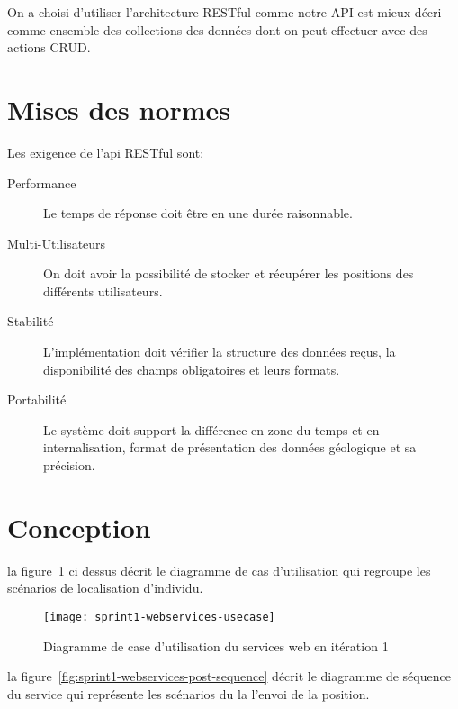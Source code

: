 On a choisi d'utiliser l'architecture RESTful comme notre API est mieux décri
comme ensemble des collections des données dont on peut effectuer avec des
actions CRUD\@.

\section{Mises des normes}

Les exigence de l'api RESTful sont:

\begin{description}
    \item [Performance] Le temps de réponse doit être en une durée raisonnable.
    \item [Multi-Utilisateurs] On doit avoir la possibilité de stocker et
        récupérer les positions des différents utilisateurs.
    \item [Stabilité] L'implémentation doit vérifier la structure des données
        reçus, la disponibilité des champs obligatoires et leurs formats.
    \item [Portabilité] Le système doit support la différence en zone du temps
        et en internalisation, format de présentation des données géologique et
        sa précision.
\end{description}


\section{Conception}
la figure~\ref{fig:sprint1-webservices-usecase}  ci dessus décrit
le diagramme de cas
d'utilisation qui regroupe les scénarios de localisation d'individu.

\begin{figure}[htbp]
    \centering
    \texttt{[image: sprint1-webservices-usecase]}
    \caption{Diagramme de case d'utilisation du services web en itération 1}
    \label{fig:sprint1-webservices-usecase}
\end{figure}

la figure~\ref{fig:sprint1-webservices-post-sequence} décrit le diagramme de
séquence du service  qui représente les scénarios du la
l'envoi de la position.

